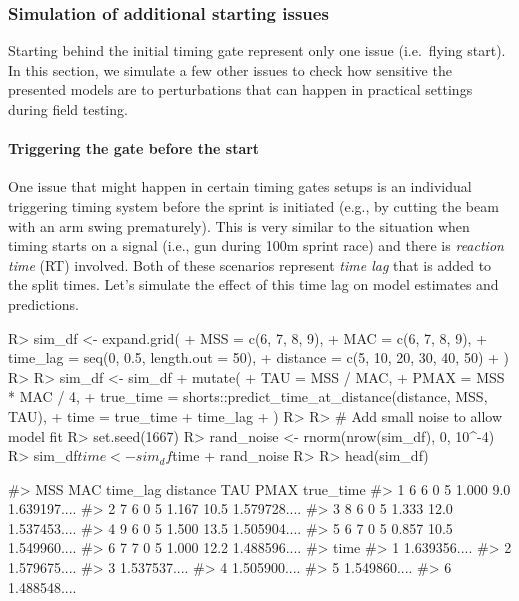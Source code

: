 \documentclass[
]{jss}
\begin{document}
\hypertarget{simulation-of-additional-starting-issues}{%
\subsubsection{Simulation of additional starting issues}\label{simulation-of-additional-starting-issues}}

Starting behind the initial timing gate represent only one issue (i.e.~flying start). In this section, we simulate a few other issues to check how sensitive the presented models are to perturbations that can happen in practical settings during field testing.

\hypertarget{triggering-the-gate-before-the-start}{%
\paragraph{Triggering the gate before the start}\label{triggering-the-gate-before-the-start}}

One issue that might happen in certain timing gates setups is an individual triggering timing system before the sprint is initiated (e.g., by cutting the beam with an arm swing prematurely). This is very similar to the situation when timing starts on a signal (i.e., gun during 100m sprint race) and there is \emph{reaction time} (RT) involved. Both of these scenarios represent \emph{time lag} that is added to the split times. Let's simulate the effect of this time lag on model estimates and predictions.

\begin{CodeChunk}
\begin{CodeInput}
R> sim_df <- expand.grid(
+   MSS = c(6, 7, 8, 9),
+   MAC = c(6, 7, 8, 9),
+   time_lag = seq(0, 0.5, length.out = 50),
+   distance = c(5, 10, 20, 30, 40, 50)
+ )
R> 
R> sim_df <- sim_df %
+   mutate(
+     TAU = MSS / MAC,
+     PMAX = MSS * MAC / 4,
+     true_time = shorts::predict_time_at_distance(distance, MSS, TAU),
+     time = true_time + time_lag
+   )
R> 
R> # Add small noise to allow model fit
R> set.seed(1667)
R> rand_noise <- rnorm(nrow(sim_df), 0, 10^-4)
R> sim_df$time <- sim_df$time + rand_noise
R> 
R> head(sim_df)
\end{CodeInput}
\begin{CodeOutput}
#>   MSS MAC time_lag distance   TAU PMAX    true_time
#> 1   6   6        0        5 1.000  9.0 1.639197....
#> 2   7   6        0        5 1.167 10.5 1.579728....
#> 3   8   6        0        5 1.333 12.0 1.537453....
#> 4   9   6        0        5 1.500 13.5 1.505904....
#> 5   6   7        0        5 0.857 10.5 1.549960....
#> 6   7   7        0        5 1.000 12.2 1.488596....
#>           time
#> 1 1.639356....
#> 2 1.579675....
#> 3 1.537537....
#> 4 1.505900....
#> 5 1.549860....
#> 6 1.488548....
\end{CodeOutput}
\end{CodeChunk}
\end{document}
